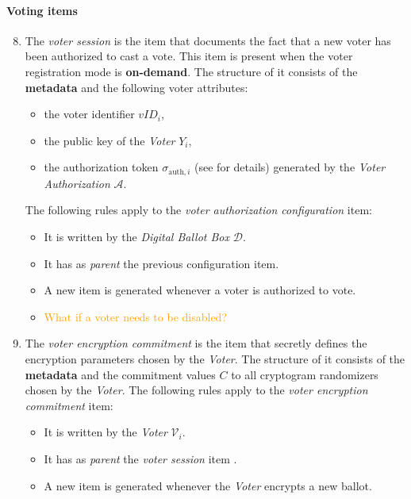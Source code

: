 \paragraph{Voting items}
\begin{enumerate}
    \setcounter{enumi}{7}
    \item
        The \textit{voter session} is the item that documents the fact that a new voter has been authorized to cast a vote. This item is present when the voter registration mode is \textbf{on-demand}. The structure of it consists of the \textbf{metadata} and the following voter attributes:
        \begin{itemize}
            \item the voter identifier $vID_i$,
            \item the public key of the \textit{Voter} $Y_i$,
            \item the authorization token $\sigma_{\mathrm{auth}, i}$ (see  for details) generated by the \textit{Voter Authorization} $\mathcal{A}$.
        \end{itemize}
        The following rules apply to the \textit{voter authorization configuration} item:
        \begin{itemize}
            \item It is written by the \textit{Digital Ballot Box} $\mathcal{D}$.
            \item It has as \textit{parent} the previous configuration item.
            \item A new item is generated whenever a voter is authorized to vote.
            \item \textcolor{orange}{What if a voter needs to be disabled?}
        \end{itemize}
    
    \item 
        The \textit{voter encryption commitment} is the item that secretly defines the encryption parameters chosen by the \textit{Voter}. The structure of it consists of the \textbf{metadata} and the commitment values $C$ to all cryptogram randomizers chosen by the \textit{Voter}. The following rules apply to the \textit{voter encryption commitment} item:
        \begin{itemize} 
            \item It is written by the \textit{Voter} $\mathcal{V}_i$.
            \item It has as \textit{parent} the \textit{voter session} item .
            \item A new item is generated whenever the \textit{Voter} encrypts a new ballot.
        \end{itemize}
    

\end{enumerate}
